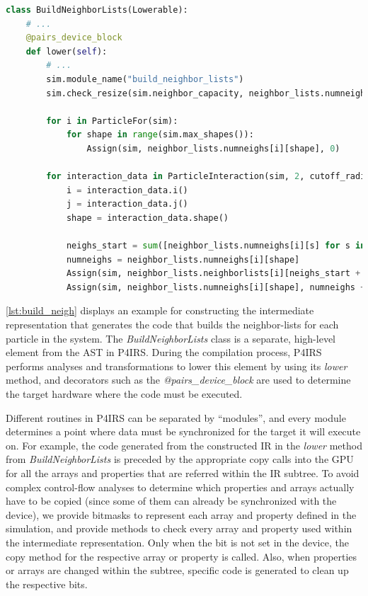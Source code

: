 \documentclass[preprint,12pt]{elsarticle}
\begin{document}
\begin{lstlisting}[language=Python,
                   label={lst:build_neigh},
                   caption={Neighbor-lists intermediate representation construction in P4IRS.}]
class BuildNeighborLists(Lowerable):
    # ...
    @pairs_device_block
    def lower(self):
        # ...
        sim.module_name("build_neighbor_lists")
        sim.check_resize(sim.neighbor_capacity, neighbor_lists.numneighs)

        for i in ParticleFor(sim):
            for shape in range(sim.max_shapes()):
                Assign(sim, neighbor_lists.numneighs[i][shape], 0)

        for interaction_data in ParticleInteraction(sim, 2, cutoff_radius, use_cell_lists=True):
            i = interaction_data.i()
            j = interaction_data.j()
            shape = interaction_data.shape()

            neighs_start = sum([neighbor_lists.numneighs[i][s] for s in range(shape)], 0)
            numneighs = neighbor_lists.numneighs[i][shape]
            Assign(sim, neighbor_lists.neighborlists[i][neighs_start + numneighs], j)
            Assign(sim, neighbor_lists.numneighs[i][shape], numneighs + 1)
\end{lstlisting}

\autoref{lst:build_neigh} displays an example for constructing the intermediate representation that generates the code that builds the neighbor-lists for each particle in the system.
The \emph{BuildNeighborLists} class is a separate, high-level element from the AST in P4IRS.
During the compilation process, P4IRS performs analyses and transformations to lower this element by using its \emph{lower} method, and decorators such as the \emph{@pairs\_device\_block} are used to determine the target hardware where the code must be executed.

Different routines in P4IRS can be separated by ``modules'', and every module determines a point where data must be synchronized for the target it will execute on.
For example, the code generated from the constructed IR in the \emph{lower} method from \emph{BuildNeighborLists} is preceded by the appropriate copy calls into the GPU for all the arrays and properties that are referred within the IR subtree.
To avoid complex control-flow analyses to determine which properties and arrays actually have to be copied (since some of them can already be synchronized with the device), we provide bitmasks to represent each array and property defined in the simulation, and provide methods to check every array and property used within the intermediate representation.
Only when the bit is not set in the device, the copy method for the respective array or property is called.
Also, when properties or arrays are changed within the subtree, specific code is generated to clean up the respective bits.
\end{document}
